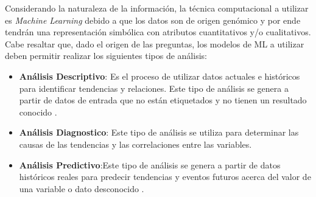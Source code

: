 Considerando la naturaleza de la información, la técnica computacional a utilizar es \textit{Machine Learning} debido a que los datos son de origen genómico y por ende tendrán una representación simbólica con atributos cuantitativos y/o cualitativos. Cabe resaltar que, dado el origen de las preguntas, los modelos de ML a utilizar deben permitir realizar los siguientes tipos de análisis:

\begin{itemize}[label=\HandRight]
	\item \textbf{Análisis Descriptivo}:
	Es el proceso de utilizar datos actuales e históricos para identificar tendencias y relaciones. Este tipo de análisis se genera a partir de datos de entrada que no están etiquetados y no tienen un resultado conocido \cite{JorgeCalvo2020}.
	
	\item \textbf{Análisis Diagnostico}:
	Este tipo de análisis se utiliza para determinar las causas de las tendencias y las correlaciones entre las variables\cite{JorgeCalvo2020}.
	
	\item \textbf{Análisis Predictivo}:Este tipo de análisis se genera a partir de datos históricos reales para predecir tendencias y eventos futuros acerca del valor de una variable o dato desconocido \cite{JorgeCalvo2020}.
\end{itemize}

